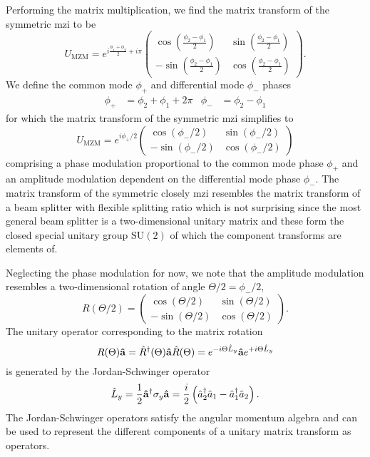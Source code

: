 Performing the matrix multiplication, we find the matrix transform of the symmetric \gls{mzi} to be
\begin{equation}
	U_\text{MZM}
	=
	e^{i\frac{\phi_1+\phi_2}{2}+i\pi}
	\begin{pmatrix}
		\cos(\frac{\phi_2-\phi_1}{2}) & \sin(\frac{\phi_2-\phi_1}{2}) \\
		-\sin(\frac{\phi_2-\phi_1}{2}) & \cos(\frac{\phi_2-\phi_1}{2})
	\end{pmatrix}
	.
\end{equation}
We define the common mode $\phi_+$ and differential mode $\phi_-$ phases
\begin{align}
	\phi_+
	&=
	\phi_2
	+
	\phi_1
	+
	2\pi
	&
	\phi_-
	&=
	\phi_2-\phi_1
\end{align}
for which the matrix transform of the symmetric \gls{mzi} simplifies to
\begin{equation}
	U_\text{MZM}
	=
	e^{i\phi_+/2}
	\begin{pmatrix}
		\cos(\phi_-/2) & \sin(\phi_-/2) \\
		-\sin(\phi_-/2) & \cos(\phi_-/2)
	\end{pmatrix}
\end{equation}
comprising a phase modulation proportional to the common mode phase $\phi_+$ and an amplitude modulation dependent on the differential mode phase $\phi_-$.
The matrix transform of the symmetric closely \gls{mzi} resembles the matrix transform of a beam splitter with flexible splitting ratio which is not surprising since the most general beam splitter is a two-dimensional unitary matrix and these form the closed special unitary group $\text{SU}(2)$ of which the component transforms are elements of.

Neglecting the phase modulation for now, we note that the amplitude modulation resembles a two-dimensional rotation of angle $\Theta/2=\phi_-/2$,
\begin{equation}
	R(\Theta/2)
	=
	\begin{pmatrix}
		\cos(\Theta/2) & \sin(\Theta/2) \\
		-\sin(\Theta/2) & \cos(\Theta/2)
	\end{pmatrix}
	.
\end{equation}
The unitary operator corresponding to the matrix rotation
\begin{equation}
	R(\Theta)
	\vb{\hat{a}}
	=
	\hat{R}^\dagger(\Theta)
	\vb{\hat{a}}
	\hat{R}(\Theta)
	=
	e^{-i\Theta\hat{L}_y}
	\vb{\hat{a}}
	e^{+i\Theta\hat{L}_y}
\end{equation}
is generated by the Jordan-Schwinger operator~\cite[p.~97]{Leonhardt2010}
\begin{equation}
	\hat{L}_y
	=
	\frac{1}{2}
	\vb{\hat{a}}^\dagger
	\sigma_y
	\vb{\hat{a}}
	=
	\frac{i}{2}
	\left(
		\hat{a}_2^\dagger
		\hat{a}_1
		-
		\hat{a}_1^\dagger
		\hat{a}_2
	\right)
	.
\end{equation}
The Jordan-Schwinger operators satisfy the angular momentum algebra and can be used to represent the different components of a unitary matrix transform as operators.

